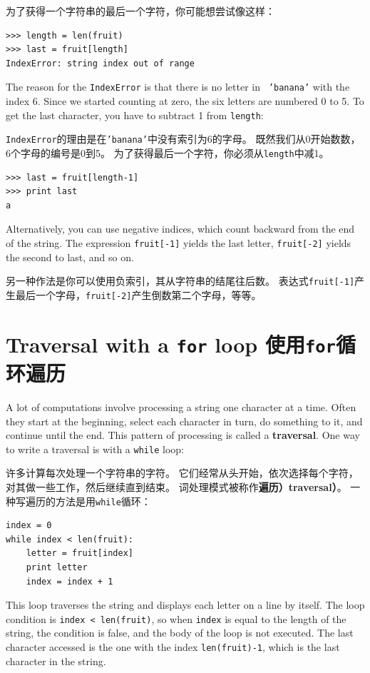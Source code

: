 \documentclass[10pt]{book}
\begin{document}
\begin{CJK}{UTF8}{gbsn}
为了获得一个字符串的最后一个字符，你可能想尝试像这样：

\begin{verbatim}
>>> length = len(fruit)
>>> last = fruit[length]
IndexError: string index out of range
\end{verbatim}
%
The reason for the {\tt IndexError} is that there is no letter in {\tt
'banana'} with the index 6.  Since we started counting at zero, the
six letters are numbered 0 to 5.  To get the last character, you have
to subtract 1 from {\tt length}:

{\tt IndexError}的理由是在{\tt 'banana'}中没有索引为6的字母。
既然我们从0开始数数，6个字母的编号是0到5。
为了获得最后一个字符，你必须从{\tt length}中减1。

\begin{verbatim}
>>> last = fruit[length-1]
>>> print last
a
\end{verbatim}
%
Alternatively, you can use negative indices, which count backward from
the end of the string.  The expression {\tt fruit[-1]} yields the last
letter, {\tt fruit[-2]} yields the second to last, and so on.

另一种作法是你可以使用负索引，其从字符串的结尾往后数。
表达式{\tt fruit[-1]}产生最后一个字母，{\tt fruit[-2]}产生倒数第二个字母，等等。


\section{Traversal with a {\tt for} loop 使用{\tt for}循环遍历}
\label{for}

A lot of computations involve processing a string one character at a
time.  Often they start at the beginning, select each character in
turn, do something to it, and continue until the end.  This pattern of
processing is called a {\bf traversal}.  One way to write a traversal
is with a {\tt while} loop:

许多计算每次处理一个字符串的字符。
它们经常从头开始，依次选择每个字符，对其做一些工作，然后继续直到结束。
词处理模式被称作{\bf 遍历）traversal）}。
一种写遍历的方法是用{\tt while}循环：

\begin{verbatim}
index = 0
while index < len(fruit):
    letter = fruit[index]
    print letter
    index = index + 1
\end{verbatim}
%
This loop traverses the string and displays each letter on a line by
itself.  The loop condition is {\tt index < len(fruit)}, so
when {\tt index} is equal to the length of the string, the
condition is false, and the body of the loop is not executed.  The
last character accessed is the one with the index {\tt len(fruit)-1},
which is the last character in the string.


\end{CJK}
\end{document}
